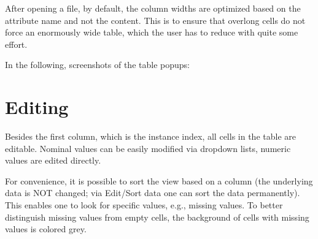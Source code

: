 After opening a file, by default, the column widths are optimized based on the attribute name and not the content. This is to ensure that overlong cells do not force an enormously wide table, which the user has to reduce with quite some effort. 

\newpage
In the following, screenshots of the table popups:
\begin{center}
\end{center}

\begin{center}
\end{center}


\newpage
\section{Editing}
Besides the first column, which is the instance index, all cells in the table are editable. Nominal values can be easily modified via dropdown lists, numeric values are edited directly.

\begin{center}
\end{center}

\newpage
For convenience, it is possible to sort the view based on a column (the underlying data is NOT changed; via Edit/Sort data one can sort the data permanently). This enables one to look for specific values, e.g., missing values. To better distinguish missing values from empty cells, the background of cells with missing values is colored grey.

\begin{center}
\end{center}
